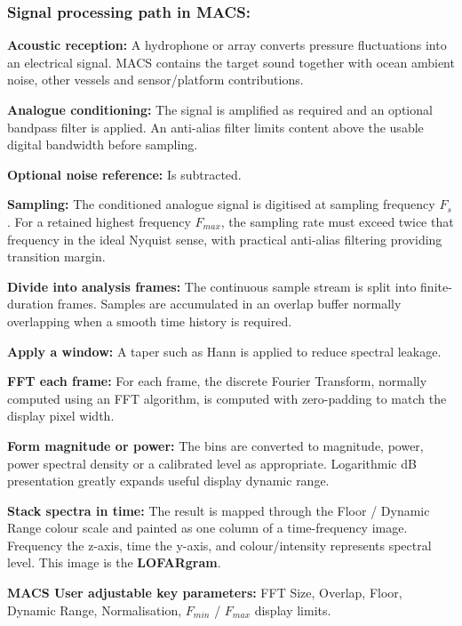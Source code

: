 \subsubsection{Signal processing path in MACS:}
\begin{compactenum}
    \item \textbf{Acoustic reception: }A hydrophone or array converts pressure fluctuations into an electrical signal. MACS contains the target sound together with ocean ambient noise, other vessels and sensor/platform contributions.
    \item \textbf{Analogue conditioning: }The signal is amplified as required and an optional bandpass filter is applied. An anti-alias filter limits content above the usable digital bandwidth before sampling.
    \item \textbf{Optional noise reference: }Is subtracted.
    \item \textbf{Sampling: }The conditioned analogue signal is digitised at sampling frequency $F_{s}$. For a retained highest frequency $F_{max}$, the sampling rate must exceed twice that frequency in the ideal Nyquist sense, with practical anti-alias filtering providing transition margin.
    \item \textbf{Divide into analysis frames: }The continuous sample stream is split into finite-duration frames. Samples are accumulated in an overlap buffer normally overlapping when a smooth time history is required.
    \item \textbf{Apply a window: }A taper such as Hann is applied to reduce spectral leakage.
    \item \textbf{FFT each frame: }For each frame, the discrete Fourier Transform, normally computed using an FFT algorithm, is computed with zero-padding to match the display pixel width.
    \item \textbf{Form magnitude or power: }The bins are converted to magnitude, power, power spectral density or a calibrated level as appropriate. Logarithmic dB presentation greatly expands useful display dynamic range.
    \item \textbf{Stack spectra in time: }The result is mapped through the Floor / Dynamic Range colour scale and painted as one column of a time-frequency image. Frequency the z-axis, time the y-axis, and colour/intensity represents spectral level. This image is the \textbf{LOFARgram}.
\end{compactenum}

\begin{advisory}
    \textbf{MACS User adjustable key parameters:} FFT Size, Overlap, Floor, Dynamic Range, Normalisation, $F_{min}$ / $F_{max}$ display limits.
\end{advisory}

